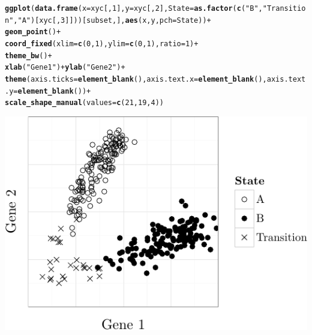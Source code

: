 \documentclass{article}\usepackage[]{graphicx}\usepackage[]{color}
\makeatletter
\def\maxwidth{ %
  \ifdim\Gin@nat@width>\linewidth
    \linewidth
  \else
    \Gin@nat@width
  \fi
}
\newcommand{\hlnum}[1]{\textcolor[rgb]{0.686,0.059,0.569}{#1}}%
\newcommand{\hlstr}[1]{\textcolor[rgb]{0.192,0.494,0.8}{#1}}%
\newcommand{\hlopt}[1]{\textcolor[rgb]{0,0,0}{#1}}%
\newcommand{\hlstd}[1]{\textcolor[rgb]{0.345,0.345,0.345}{#1}}%
\newcommand{\hlkwc}[1]{\textcolor[rgb]{0.333,0.667,0.333}{#1}}%
\newcommand{\hlkwd}[1]{\textcolor[rgb]{0.737,0.353,0.396}{\textbf{#1}}}%
\newenvironment{kframe}{%
 \def\at@end@of@kframe{}%
 \ifinner\ifhmode%
  \def\at@end@of@kframe{\end{minipage}}%
  \begin{minipage}{\columnwidth}%
 \fi\fi%
 \def\FrameCommand##1{\hskip\@totalleftmargin \hskip-\fboxsep
 \colorbox{shadecolor}{##1}\hskip-\fboxsep
     \hskip-\linewidth \hskip-\@totalleftmargin \hskip\columnwidth}%
 \MakeFramed {\advance\hsize-\width
   \@totalleftmargin\z@ \linewidth\hsize
   \@setminipage}}%
 {\par\unskip\endMakeFramed%
 \at@end@of@kframe}
\newenvironment{knitrout}{}{} %
\makeatother
\begin{document}
\begin{knitrout}
\begin{kframe}
\begin{alltt}
\hlkwd{ggplot}\hlstd{(}\hlkwd{data.frame}\hlstd{(}\hlkwc{x} \hlstd{= xyc[,}\hlnum{1}\hlstd{],} \hlkwc{y} \hlstd{= xyc[,}\hlnum{2}\hlstd{],} \hlkwc{State} \hlstd{=} \hlkwd{as.factor}\hlstd{(}\hlkwd{c}\hlstd{(}\hlstr{"B"}\hlstd{,} \hlstr{"Transition"}\hlstd{,} \hlstr{"A"}\hlstd{)[xyc[,}\hlnum{3}\hlstd{]]))[subset,],} \hlkwd{aes}\hlstd{(x, y,} \hlkwc{pch} \hlstd{= State))} \hlopt{+}
        \hlkwd{geom_point}\hlstd{()} \hlopt{+}
        \hlkwd{coord_fixed}\hlstd{(}\hlkwc{xlim} \hlstd{=} \hlkwd{c}\hlstd{(}\hlnum{0}\hlstd{,} \hlnum{1}\hlstd{),} \hlkwc{ylim} \hlstd{=} \hlkwd{c}\hlstd{(}\hlnum{0}\hlstd{,} \hlnum{1}\hlstd{),} \hlkwc{ratio} \hlstd{=} \hlnum{1}\hlstd{)} \hlopt{+}
        \hlkwd{theme_bw}\hlstd{()} \hlopt{+}
        \hlkwd{xlab}\hlstd{(}\hlstr{"Gene 1"}\hlstd{)} \hlopt{+} \hlkwd{ylab}\hlstd{(}\hlstr{"Gene 2"}\hlstd{)} \hlopt{+}
        \hlkwd{theme}\hlstd{(}\hlkwc{axis.ticks} \hlstd{=} \hlkwd{element_blank}\hlstd{(),} \hlkwc{axis.text.x} \hlstd{=} \hlkwd{element_blank}\hlstd{(),} \hlkwc{axis.text.y} \hlstd{=} \hlkwd{element_blank}\hlstd{())} \hlopt{+}
        \hlkwd{scale_shape_manual}\hlstd{(}\hlkwc{values} \hlstd{=} \hlkwd{c}\hlstd{(}\hlnum{21}\hlstd{,} \hlnum{19}\hlstd{,} \hlnum{4}\hlstd{))}
\end{alltt}
\end{kframe}

{\centering \includegraphics[width=\maxwidth]{figure/plots-1} 

}



\end{knitrout}
\end{document}
